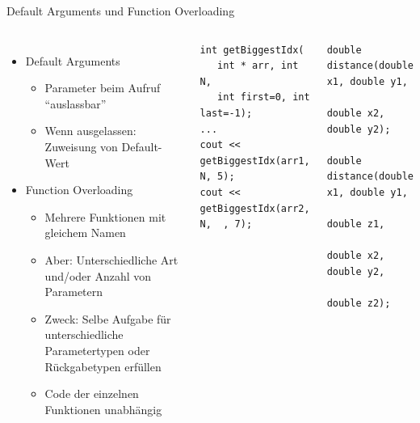 \begin{frame}[fragile]{Default Arguments und Function Overloading}
%
\vspace{-6pt}
\begin{columns}[T]
\begin{itemize}
\item Default Arguments
	\begin{itemize}
	\item Parameter beim Aufruf \enquote{auslassbar}
	\item Wenn ausgelassen: Zuweisung von Default-Wert
	\end{itemize}
\item Function Overloading
	\begin{itemize}
	\item Mehrere Funktionen mit gleichem Namen
	\item Aber: Unterschiedliche Art und/oder Anzahl von Parametern
	\item Zweck: Selbe Aufgabe für unterschiedliche Parametertypen oder Rückgabetypen erfüllen
	\item Code der einzelnen Funktionen unabhängig
	\end{itemize}

\end{itemize}
\vspace{-6pt}
\begin{codebox}
\begin{verbatim}
int getBiggestIdx(
   int * arr, int N, 
   int first=0, int last=-1);
...
cout << getBiggestIdx(arr1, N, 5);
cout << getBiggestIdx(arr2, N,  , 7);
\end{verbatim}
\end{codebox}
%
\vspace{-12pt}
\begin{codebox}
\begin{verbatim}
double distance(double x1, double y1,
                double x2, double y2);

double distance(double x1, double y1, 
                double z1,
                double x2, double y2, 
                double z2);
\end{verbatim}
\end{codebox}
\end{columns}
%
\end{frame}


